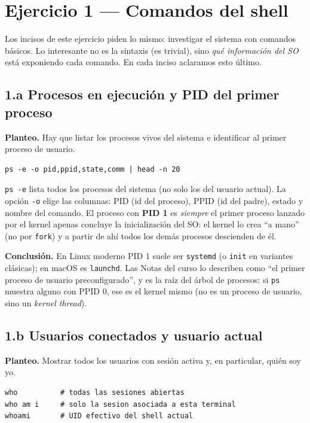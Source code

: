 \documentclass[11pt,a4paper]{article}
\begin{document}
\section{Ejercicio 1 --- Comandos del shell}

Los incisos de este ejercicio piden lo mismo: investigar el sistema con
comandos básicos. Lo interesante no es la sintaxis (es trivial), sino
\emph{qué información del SO} está exponiendo cada comando. En cada
inciso aclaramos esto último.

\subsection*{1.a Procesos en ejecución y PID del primer proceso}

\textbf{Planteo.} Hay que listar los procesos vivos del sistema e
identificar al primer proceso de usuario.

\begin{lstlisting}
ps -e -o pid,ppid,state,comm | head -n 20
\end{lstlisting}

\texttt{ps -e} lista todos los procesos del sistema (no solo los del
usuario actual). La opción \texttt{-o} elige las columnas: PID (id del
proceso), PPID (id del padre), estado y nombre del comando. El proceso
con \textbf{PID 1} es \emph{siempre} el primer proceso lanzado por el
kernel apenas concluye la inicialización del SO: el kernel lo crea ``a
mano'' (no por \texttt{fork}) y a partir de ahí todos los demás
procesos descienden de él.

\textbf{Conclusión.} En Linux moderno PID 1 suele ser \texttt{systemd}
(o \texttt{init} en variantes clásicas); en macOS es \texttt{launchd}.
Las Notas del curso lo describen como ``el primer proceso de usuario
preconfigurado'', y es la raíz del árbol de procesos: si \texttt{ps}
muestra alguno con PPID 0, ese es el kernel mismo (no es un proceso de
usuario, sino un \emph{kernel thread}).

\subsection*{1.b Usuarios conectados y usuario actual}

\textbf{Planteo.} Mostrar todos los usuarios con sesión activa y, en
particular, quién soy yo.

\begin{lstlisting}
who          # todas las sesiones abiertas
who am i     # solo la sesion asociada a esta terminal
whoami       # UID efectivo del shell actual
\end{lstlisting}
\end{document}
